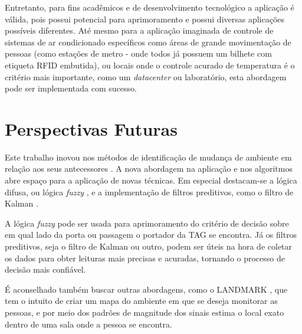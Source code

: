 Entretanto, para fins acadêmicos e de desenvolvimento tecnológico a aplicação é válida, pois possui potencial para aprimoramento e possui diversas aplicações possíveis diferentes. Até mesmo para a aplicação imaginada de controle de sistemas de ar condicionado específicos como áreas de grande movimentação de pessoas (como estações de metro - onde todos já possuem um bilhete com etiqueta RFID embutida), ou locais onde o controle acurado de temperatura é o critério mais importante, como um \textit{datacenter} ou laboratório, esta abordagem pode ser implementada com sucesso.


\section{Perspectivas Futuras}

Este trabalho inovou nos métodos de identificação de mudança de ambiente em relação aos seus antecessores \cite{TG2013OliveiraERocha} \cite{TG2015RaissaERenata}. A nova abordagem na aplicação e nos algoritmos abre espaço para a aplicação de novas técnicas. Em especial destacam-se a lógica difusa, ou lógica \textit{fuzzy} \cite{yen1999fuzzy}, e a implementação de filtros preditivos, como o filtro de Kalman \cite{welch1995introduction}.

A lógica \textit{fuzzy} pode ser usada para aprimoramento do critério de decisão sobre em qual lado da porta ou passagem o portador da TAG se encontra. Já os filtros preditivos, seja o filtro de Kalman ou outro, podem ser úteis na hora de coletar os dados para obter leituras mais precisas e acuradas, tornando o processo de decisão mais confiável.

É aconselhado também buscar outras abordagens, como o LANDMARK \cite{bekkali2007rfid}, que tem o intuito de criar um mapa do ambiente em que se deseja monitorar as pessoas, e por meio dos padrões de magnitude dos sinais estima o local exato dentro de uma sala onde a pessoa se encontra.
